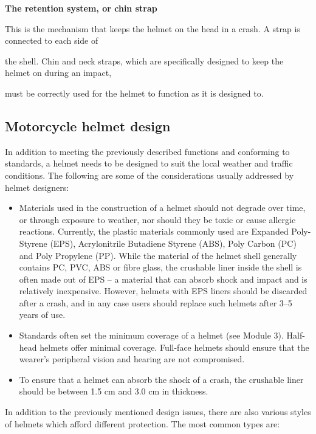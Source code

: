 \textbf{The retention system, or chin strap}\vspace{.2cm}



This is the mechanism that keeps the helmet on the head in a crash. A strap is connected to each side of

the shell. Chin and neck straps, which are specifically designed to keep the helmet on during an impact,

must be correctly used for the helmet to function as it is designed to.\vspace{.4cm}

\subsection{Motorcycle helmet design}
In addition to meeting the previously described functions and conforming to standards, a helmet needs to be designed to suit the local
weather and traffic conditions. The following are some of the considerations usually
addressed by helmet designers:
\begin{itemize}
	\item Materials used in the construction of a helmet should not degrade over time, or
	through exposure to weather, nor should they be toxic or cause allergic reactions.
	Currently, the plastic materials commonly used are Expanded Poly-Styrene (EPS),
	Acrylonitrile Butadiene Styrene (ABS), Poly Carbon (PC) and Poly Propylene
	(PP). While the material of the helmet shell generally contains PC, PVC, ABS or
	fibre glass, the crushable liner inside the shell is often made out of EPS – a material
	that can absorb shock and impact and is relatively inexpensive. However, helmets
	with EPS liners should be discarded after a crash, and in any case users should
	replace such helmets after 3–5 years of use.
	\item Standards often set the minimum coverage of a helmet (see Module 3). Half-head
	helmets offer minimal coverage. Full-face helmets should ensure that the wearer’s
	peripheral vision and hearing are not compromised.
	\item To ensure that a helmet can absorb the shock of a crash, the crushable liner should
	be between 1.5 cm and 3.0 cm in thickness.
	\vspace{.5cm}
\end{itemize}
In addition to the previously mentioned design issues, there are also various styles of
helmets which afford different protection. The most common types are:\vspace{.2cm}
